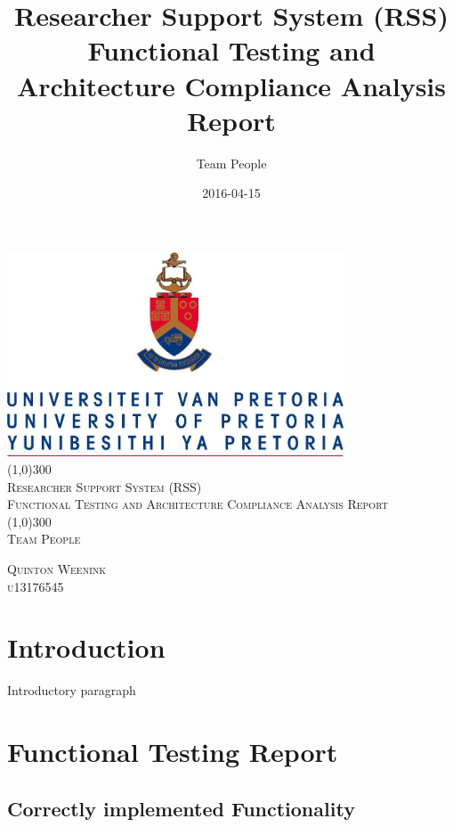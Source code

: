 \documentclass{article}
\title{
Researcher Support System (RSS)\\
Functional Testing and Architecture Compliance Analysis Report
}
\date{2016-04-15}
\author{Team People}
\begin{document}
\begin{titlepage}
	\begin{center}
		\includegraphics[width=10cm]{UP.jpg}  \\
		[1cm]
		\line(1,0){300} \\
		[0.3cm]
		\textsc{\Large
			Researcher Support System (RSS)\\
			Functional Testing and Architecture Compliance Analysis Report
		}\\
		[0.1cm]
		\line(1,0){300} \\
		[0.4cm]
		\textsc{\Large
			Team People
		} \\

	\end{center}
	\begin{flushright}
	\textsc{\Large
	Quinton Weenink\\ 
	u13176545\\
	}
	\end{flushright}
\end{titlepage}

\tableofcontents
\thispagestyle{empty}
\cleardoublepage

\setcounter{page}{1}
\section{Introduction}
Introductory paragraph

\newpage

\section{Functional Testing Report}

	\subsection{Correctly implemented Functionality}
	
\end{document}
